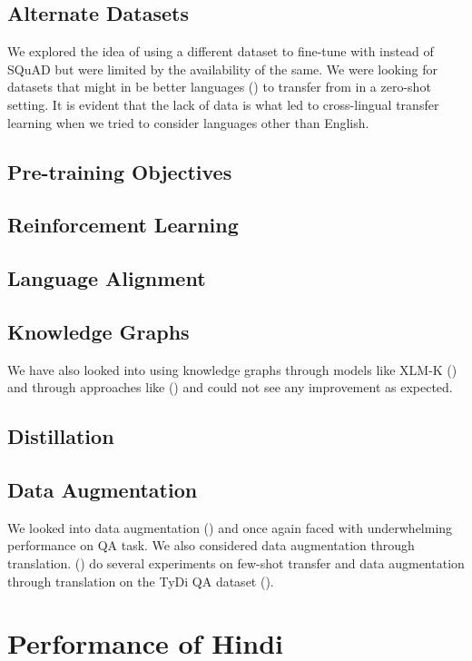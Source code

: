 \documentclass[12pt]{article}   %
\begin{document}
\subsection{Alternate Datasets}
We explored the idea of using a different dataset to fine-tune with instead of SQuAD but were limited by the availability of the same. We were looking for datasets that might in be better languages (\cite{lin-etal-2019-choosing}) to transfer from in a zero-shot setting. It is evident that the lack of data is what led to cross-lingual transfer learning when we tried to consider languages other than English. 

\subsection{Pre-training Objectives}


\subsection{Reinforcement Learning}

\subsection{Language Alignment}

\subsection{Knowledge Graphs}
We have also looked into using knowledge graphs through models like XLM-K (\cite{xlmk}) and through approaches like (\cite{isdg}) and could not see any improvement as expected.

\subsection{Distillation}

\subsection{Data Augmentation}
We looked into data augmentation (\cite{riabi-etal-2021-synthetic}) and once again faced with underwhelming performance on QA task. We also considered data augmentation through translation. (\cite{debnath-etal-2021-towards}) do several experiments on few-shot transfer and data augmentation through translation on the {T}y{D}i {QA} dataset (\cite{clark-etal-2020-tydi}).

\section{Performance of Hindi}
\end{document}
